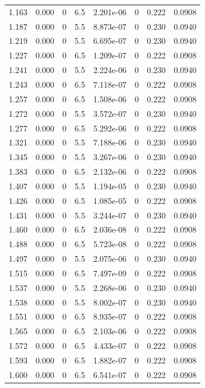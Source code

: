 \documentclass[preview]{standalone}
\begin{document}
{{{\begin{tabular}{L{1.2cm}C{1.2cm} C{0.3cm}C{0.5cm} C{1.4cm}C{1.4cm} C{1.4cm}C{1.4cm}}
  1.163  &  0.000  & 0     & 6.5 &  2.201e-06  & 0  & 0.222 &  0.0908   \\ 
  1.187  &  0.000  & 0     & 5.5 &  8.873e-07  & 0  & 0.230 &  0.0940   \\ 
  1.219  &  0.000  & 0     & 5.5 &  6.695e-07  & 0  & 0.230 &  0.0940   \\ 
  1.227  &  0.000  & 0     & 6.5 &  1.209e-07  & 0  & 0.222 &  0.0908   \\ 
  1.241  &  0.000  & 0     & 5.5 &  2.224e-06  & 0  & 0.230 &  0.0940   \\ 
  1.243  &  0.000  & 0     & 6.5 &  7.118e-07  & 0  & 0.222 &  0.0908   \\ 
  1.257  &  0.000  & 0     & 6.5 &  1.508e-06  & 0  & 0.222 &  0.0908   \\ 
  1.272  &  0.000  & 0     & 5.5 &  3.572e-07  & 0  & 0.230 &  0.0940   \\ 
  1.277  &  0.000  & 0     & 6.5 &  5.292e-06  & 0  & 0.222 &  0.0908   \\ 
  1.321  &  0.000  & 0     & 5.5 &  7.188e-06  & 0  & 0.230 &  0.0940   \\ 
  1.345  &  0.000  & 0     & 5.5 &  3.267e-06  & 0  & 0.230 &  0.0940   \\ 
  1.383  &  0.000  & 0     & 6.5 &  2.132e-06  & 0  & 0.222 &  0.0908   \\ 
  1.407  &  0.000  & 0     & 5.5 &  1.194e-05  & 0  & 0.230 &  0.0940   \\ 
  1.426  &  0.000  & 0     & 6.5 &  1.085e-05  & 0  & 0.222 &  0.0908   \\ 
  1.431  &  0.000  & 0     & 5.5 &  3.244e-07  & 0  & 0.230 &  0.0940   \\ 
  1.460  &  0.000  & 0     & 6.5 &  2.036e-08  & 0  & 0.222 &  0.0908   \\ 
  1.488  &  0.000  & 0     & 6.5 &  5.723e-08  & 0  & 0.222 &  0.0908   \\ 
  1.497  &  0.000  & 0     & 5.5 &  2.075e-06  & 0  & 0.230 &  0.0940   \\ 
  1.515  &  0.000  & 0     & 6.5 &  7.497e-09  & 0  & 0.222 &  0.0908   \\ 
  1.537  &  0.000  & 0     & 5.5 &  2.268e-06  & 0  & 0.230 &  0.0940   \\ 
  1.538  &  0.000  & 0     & 5.5 &  8.002e-07  & 0  & 0.230 &  0.0940   \\ 
  1.551  &  0.000  & 0     & 6.5 &  8.935e-07  & 0  & 0.222 &  0.0908   \\ 
  1.565  &  0.000  & 0     & 6.5 &  2.103e-06  & 0  & 0.222 &  0.0908   \\ 
  1.572  &  0.000  & 0     & 6.5 &  4.433e-07  & 0  & 0.222 &  0.0908   \\ 
  1.593  &  0.000  & 0     & 6.5 &  1.882e-07  & 0  & 0.222 &  0.0908   \\ 
  1.600  &  0.000  & 0     & 6.5 &  6.541e-07  & 0  & 0.222 &  0.0908   \\ 
\hline 
\end{tabular} 

}}}
\end{document}
